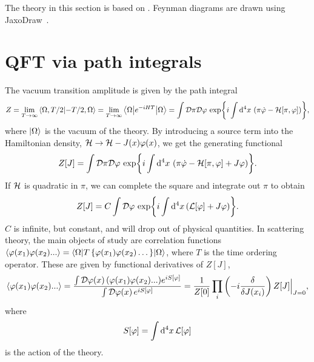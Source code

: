 \label{Free energy and the effective action}
The theory in this section is based on \cite{Peskin:IntroQFT,weinberg_1995,weinberg_1996_vol2,Schwartz:QFT}.
Feynman diagrams are drawn using JaxoDraw~\cite{JaxoDraw}.

\section{QFT via path integrals}
\label{section:path integral}

The vacuum transition amplitude is given by the path integral
\begin{equation}
    Z = \lim_{T\rightarrow \infty} \braket{\Omega, T/2}{-T/2, \Omega}
    = \lim_{T\rightarrow \infty} \left\langle \Omega {\left|  e^{-iHT}  \right|} \Omega \right\rangle
    = \int \mathcal{D} \pi \mathcal{D} \varphi \, \exp{ i \int \dd^4 x \, \left(\pi \dot \varphi - \mathcal{H}[\pi, \varphi]\right) },
\end{equation}
where $\ket{\Omega}$ is the vacuum of the theory.
By introducing a source term into the Hamiltonian density, $\mathcal{H} \rightarrow \mathcal{H} - J(x)\varphi(x)$, we get the generating functional
\begin{equation}
    Z[J] = 
    \int \mathcal{D} \pi \mathcal{D} \varphi \, 
    \exp{ i \int \dd^4 x \, \left(\pi \dot \varphi - \mathcal{H}[\pi, \varphi]+ J\varphi\right) }.
\end{equation}
If $\mathcal{H}$ is quadratic in $\pi$, we can complete the square and integrate out $\pi$ to obtain
\begin{equation}
    Z[J] = C \int \mathcal{D} \varphi \, \exp{i \int \dd^4 x\, (\mathcal{L}[\varphi] + J \varphi)}.
\end{equation}
$C$ is infinite, but constant, and will drop out of physical quantities.
In scattering theory, the main objects of study are correlation functions $\ex{\varphi(x_1)\varphi(x_2)...} = \inner{\Omega}{T\left\{\varphi(x_1)\varphi(x_2)\dots\right\}}{\Omega}$, where $T$ is the time ordering operator.
These are given by functional derivatives of $Z[J]$, 
\begin{equation}
    \label{correlator from generating functional}
    \ex{\varphi(x_1)\varphi(x_2)...}
    = 
    \frac{\int \D \varphi(x)\,  (\varphi(x_1)\varphi(x_2)...) e^{i S[\varphi]}}
        {\int \D \varphi(x)\, e^{i S[\varphi]}}
    =
    \frac{1}{Z[0]} \prod_i\left( -i  \fdv{J(x_i)}\right) Z[J]\Big|_{J = 0},
\end{equation}
where 
\begin{equation}
    S[\varphi] = \int \dd^4 x \, \mathcal{L}[\varphi]
\end{equation}
is the action of the theory.
